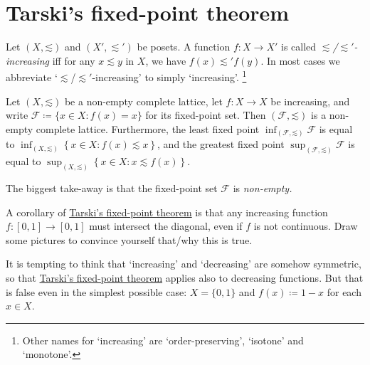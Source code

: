 \section{Tarski's fixed-point theorem}
\label{tar:tar}

\begin{definition}
	\label{definition:incresing}
	Let $(X,\mathord{\lesssim})$ and $(X',\mathord{\lesssim'})$ be posets. A function $f : X \to X'$ is called \emph{$\lesssim$/$\lesssim'$-increasing} iff for any $x \lesssim y$ in $X$, we have $f(x) \lesssim' f(y)$. In most cases we abbreviate `$\lesssim$/$\lesssim'$-increasing' to simply `increasing'.%
		\footnote{Other names for `increasing' are `order-preserving', `isotone' and `monotone'.}
\end{definition}

\begin{namedthm}
	\label{theorem:tarski}
	Let $(X,\mathord{\lesssim})$ be a non-empty complete lattice, let $f : X \to X$ be increasing, and write $\mathcal{F} \coloneqq \{ x \in X : f(x)=x \}$ for its fixed-point set. Then $(\mathcal{F},\mathord{\lesssim})$ is a non-empty complete lattice.
	Furthermore, the least fixed point $\inf_{(\mathcal{F},\mathord{\lesssim})} \mathcal{F}$ is equal to $\inf_{(X,\mathord{\lesssim})} \left\{ x \in X : f(x) \lesssim x \right\}$,
	and the greatest fixed point $\sup_{(\mathcal{F},\mathord{\lesssim})} \mathcal{F}$ is equal to $\sup_{(X,\mathord{\lesssim})} \left\{ x \in X : x \lesssim f(x) \right\}$.
\end{namedthm}

The biggest take-away is that the fixed-point set $\mathcal{F}$ is \emph{non-empty.}

\begin{exercise}
	\label{exercise:tarski_unit}
	A corollary of \hyperref[theorem:tarski]{Tarski's fixed-point theorem} is that any increasing function $f : [0,1] \to [0,1]$ must intersect the diagonal, even if $f$ is not continuous. Draw some pictures to convince yourself that/why this is true.
\end{exercise}

\begin{remark}
	\label{remark:tarski_decr}
	It is tempting to think that `increasing' and `decreasing' are somehow symmetric, so that \hyperref[theorem:tarski]{Tarski's fixed-point theorem} applies also to decreasing functions. But that is false even in the simplest possible case: $X = \{0,1\}$ and $f(x) \coloneqq 1-x$ for each $x \in X$.
\end{remark}

